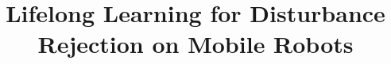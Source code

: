 \documentclass{aamas2016}
\begin{document}


\title{{\color{red} Lifelong Learning for Disturbance Rejection on Mobile Robots} }




%
%
%
%

%

\end{document}
